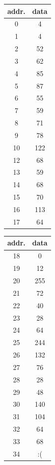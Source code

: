 \documentclass{article}
\begin{document}
\begin{figure}[ht]
    \begin{minipage}[c]{.35\linewidth}
    \centering 
    \begin{tabular}{c|c}
        addr. & data \\
        \hline \hline
        0  & 4   \\
        1  & 4   \\
        2  & 52  \\
        3  & 62  \\
        4  & 85  \\
        5  & 87  \\
        6  & 55  \\
        7  & 59  \\
        8  & 71  \\
        9  & 78  \\
        10 & 122 \\
        12 & 68  \\
        13 & 59  \\
        14 & 68  \\
        15 & 70  \\
        16 & 113 \\
        17 & 64  \\
       \end{tabular}
    \begin{tabular}{c|c}
        addr. & data \\
        \hline \hline
        18 & 0   \\
        19 & 12  \\
        20 & 255 \\
        21 & 72  \\
        22 & 40  \\
        23 & 28  \\
        24 & 64  \\
        25 & 244 \\
        26 & 132 \\
        27 & 76  \\
        28 & 28  \\
        29 & 48  \\
        30 & 140 \\
        31 & 104 \\
        32 & 64  \\
        33 & 68  \\
        34 & :(  \\
       \end{tabular}

\end{minipage}
\end{figure}
\end{document}

